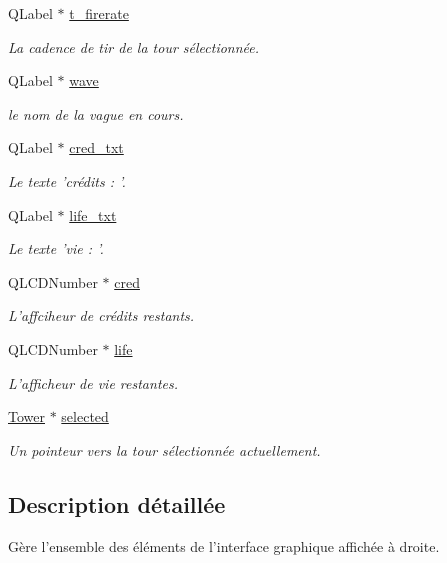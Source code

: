 \begin{DoxyCompactItemize}
QLabel $\ast$ \hyperlink{classUI_aad8e7e7def9708c2b6e6511abb548b6d}{t\_\-firerate}
\begin{DoxyCompactList}\small\item\em La cadence de tir de la tour sélectionnée. \end{DoxyCompactList}\item 
QLabel $\ast$ \hyperlink{classUI_a3f735d7d737b15dad131baf43b58eb17}{wave}
\begin{DoxyCompactList}\small\item\em le nom de la vague en cours. \end{DoxyCompactList}\item 
QLabel $\ast$ \hyperlink{classUI_a931c707005030131187d786b0966fc22}{cred\_\-txt}
\begin{DoxyCompactList}\small\item\em Le texte 'crédits : '. \end{DoxyCompactList}\item 
QLabel $\ast$ \hyperlink{classUI_a2f7c3ea7fc4e840270e989b0e68ec82b}{life\_\-txt}
\begin{DoxyCompactList}\small\item\em Le texte 'vie : '. \end{DoxyCompactList}\item 
QLCDNumber $\ast$ \hyperlink{classUI_a1e6f0b63d2e4cb88476541452f81bd64}{cred}
\begin{DoxyCompactList}\small\item\em L'affciheur de crédits restants. \end{DoxyCompactList}\item 
QLCDNumber $\ast$ \hyperlink{classUI_a19d84baf49aecab7730ae12609b83be7}{life}
\begin{DoxyCompactList}\small\item\em L'afficheur de vie restantes. \end{DoxyCompactList}\item 
\hyperlink{classTower}{Tower} $\ast$ \hyperlink{classUI_af4edf19be15102c7aefb0e682c72c475}{selected}
\begin{DoxyCompactList}\small\item\em Un pointeur vers la tour sélectionnée actuellement. \end{DoxyCompactList}\end{DoxyCompactItemize}


\subsection{Description détaillée}
Gère l'ensemble des éléments de l'interface graphique affichée à droite. 

